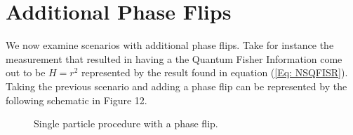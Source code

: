 \documentclass[twocolumn]{article}
\begin{document}
\section*{Additional Phase Flips}
We now examine scenarios with additional phase flips. Take for instance the measurement that resulted in having a the Quantum Fisher Information come out to be $H=r^2$ represented by the result found in equation (\ref{Eq: NSQFISR}). Taking the previous scenario and adding a phase flip can be represented by the following schematic in Figure 12.
\begin{figure}[ht]
    \centering
    \caption{\footnotesize{Single particle procedure with a phase flip.}}
    \label{Fig: SPPF}  
\end{figure}
\end{document}
